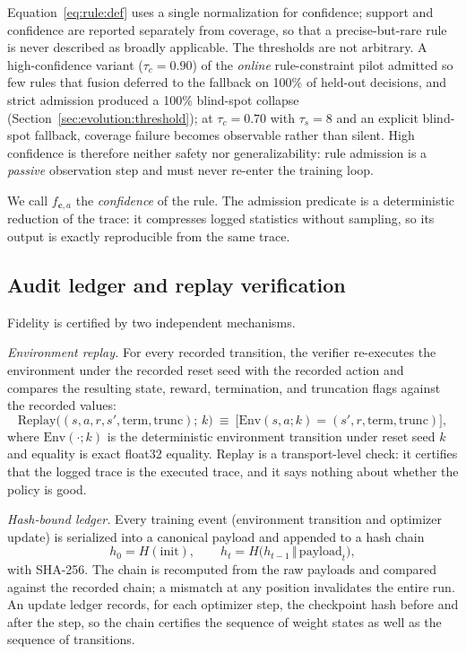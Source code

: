 \documentclass[11pt]{article}
\begin{document}
\noindent Equation~\eqref{eq:rule:def} uses a single normalization for confidence; support and confidence
are reported separately from coverage, so that a precise-but-rare rule is never described as broadly
applicable. The thresholds are not arbitrary. A high-confidence variant ($\tau_c=0.90$) of the
\emph{online} rule-constraint pilot admitted so few rules that fusion deferred to the fallback on
100\% of held-out decisions, and strict admission produced a 100\% blind-spot collapse
(Section~\ref{sec:evolution:threshold}); at $\tau_c=0.70$ with $\tau_s=8$ and an explicit blind-spot
fallback, coverage failure becomes observable rather than silent. High confidence is therefore neither
safety nor generalizability: rule admission is a \emph{passive} observation step and must never re-enter
the training loop.

We call $f_{\mathbf{c},a}$ the \emph{confidence} of the rule. The admission predicate is a
deterministic reduction of the trace: it compresses logged statistics without sampling, so its
output is exactly reproducible from the same trace.

\subsection{Audit ledger and replay verification}
\label{sec:method:ledger}

Fidelity is certified by two independent mechanisms.

\emph{Environment replay.} For every recorded transition, the verifier re-executes the environment
under the recorded reset seed with the recorded action and compares the resulting state, reward,
termination, and truncation flags against the recorded values:
\begin{equation}
\mathrm{Replay}\big((s,a,r,s',\mathrm{term},\mathrm{trunc});\,k\big)\ \equiv\ \big[\mathrm{Env}(s,a;k) = (s',r,\mathrm{term},\mathrm{trunc})\big],
\label{eq:replay}
\end{equation}
where $\mathrm{Env}(\cdot;k)$ is the deterministic environment transition under reset seed $k$ and
equality is exact float32 equality. Replay is a transport-level check: it certifies that the logged
trace is the executed trace, and it says nothing about whether the policy is good.

\emph{Hash-bound ledger.} Every training event (environment transition and optimizer update) is
serialized into a canonical payload and appended to a hash chain
\begin{equation}
h_0 = H(\mathrm{init}), \qquad h_{t} = H\big(h_{t-1} \,\Vert\, \mathrm{payload}_t\big),
\label{eq:hashchain}
\end{equation}
with SHA-256. The chain is recomputed from the raw payloads and compared against the recorded chain;
a mismatch at any position invalidates the entire run. An update ledger records, for each optimizer
step, the checkpoint hash before and after the step, so the chain certifies the sequence of weight
states as well as the sequence of transitions.
\end{document}
